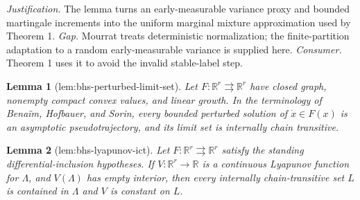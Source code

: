 \documentclass{article}
\newtheorem{lemma}{Lemma}
\begin{document}
\par\smallskip\noindent \textit{Justification.} The lemma turns an early-measurable variance proxy and bounded martingale increments into the uniform marginal mixture approximation used by Theorem 1. \textit{Gap.} Mourrat treats deterministic normalization; the finite-partition adaptation to a random early-measurable variance is supplied here. \textit{Consumer.} Theorem 1 uses it to avoid the invalid stable-label step.

\begin{lemma}[lem:bhs-perturbed-limit-set]\label{lem:bhs-perturbed-limit-set}
Let \(F:\mathbb R^r\rightrightarrows\mathbb R^r\) have closed graph, nonempty compact convex values, and linear growth. In the terminology of Bena\"im, Hofbauer, and Sorin, every bounded perturbed solution of \(\dot x\in F(x)\) is an asymptotic pseudotrajectory, and its limit set is internally chain transitive.
\end{lemma}

\begin{lemma}[lem:bhs-lyapunov-ict]\label{lem:bhs-lyapunov-ict}
Let \(F:\mathbb R^r\rightrightarrows\mathbb R^r\) satisfy the standing differential-inclusion hypotheses. If \(V:\mathbb R^r\to\mathbb R\) is a continuous Lyapunov function for \(\Lambda\), and \(V(\Lambda)\) has empty interior, then every internally chain-transitive set \(L\) is contained in \(\Lambda\) and \(V\) is constant on \(L\).
\end{lemma}
\end{document}
